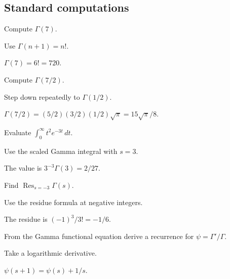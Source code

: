 \subsection*{Standard computations}

\begin{exercise}\label{exr:iv19-expand-01}
Compute \(\Gamma(7)\).
\end{exercise}
\begin{hint}
Use \(\Gamma(n+1)=n!\).
\end{hint}
\begin{solution}
\(\Gamma(7)=6!=720\).
\end{solution}

\begin{exercise}\label{exr:iv19-expand-02}
Compute \(\Gamma(7/2)\).
\end{exercise}
\begin{hint}
Step down repeatedly to \(\Gamma(1/2)\).
\end{hint}
\begin{solution}
\(\Gamma(7/2)=(5/2)(3/2)(1/2)\sqrt{\pi}=15\sqrt{\pi}/8\).
\end{solution}

\begin{exercise}\label{exr:iv19-expand-03}
Evaluate \(\int_0^\infty t^2e^{-3t}\,dt\).
\end{exercise}
\begin{hint}
Use the scaled Gamma integral with \(s=3\).
\end{hint}
\begin{solution}
The value is \(3^{-3}\Gamma(3)=2/27\).
\end{solution}

\begin{exercise}[Residue]\label{exr:iv19-expand-04}
Find \(\operatorname{Res}_{s=-3}\Gamma(s)\).
\end{exercise}
\begin{hint}
Use the residue formula at negative integers.
\end{hint}
\begin{solution}
The residue is \((-1)^3/3!=-1/6\).
\end{solution}

\begin{exercise}\label{exr:iv19-expand-05}
From the Gamma functional equation derive a recurrence for \(\psi=\Gamma'/\Gamma\).
\end{exercise}
\begin{hint}
Take a logarithmic derivative.
\end{hint}
\begin{solution}
\(\psi(s+1)=\psi(s)+1/s\).
\end{solution}

